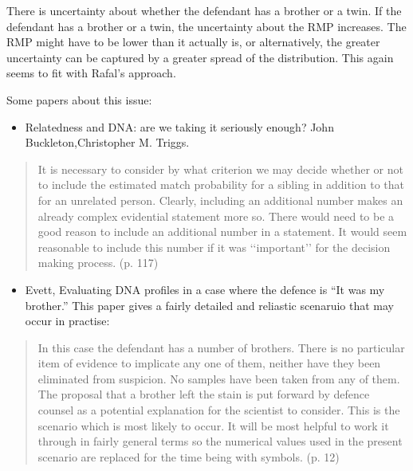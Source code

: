 \documentclass[
  10pt,
  dvipsnames,enabledeprecatedfontcommands]{scrartcl}
\providecommand{\tightlist}{%
  \setlength{\itemsep}{0pt}\setlength{\parskip}{0pt}}
\begin{document}
There is uncertainty about whether the defendant has a brother or a
twin. If the defendant has a brother or a twin, the uncertainty about
the RMP increases. The RMP might have to be lower than it actually is,
or alternatively, the greater uncertainty can be captured by a greater
spread of the distribution. This again seems to fit with Rafal's
approach.


Some papers about this issue:

\begin{itemize}
\tightlist
\item
  Relatedness and DNA: are we taking it seriously enough? John
  Buckleton,Christopher M. Triggs.
\end{itemize}

\begin{quote}
 It is necessary to consider by what criterion we may
decide whether or not to include the estimated match
probability for a sibling in addition to that for an unrelated
person. Clearly, including an additional number makes an
already complex evidential statement more so. There would
need to be a good reason to include an additional number
in a statement. It would seem reasonable to include
this number if it was ‘‘important’’ for the decision making
process. (p. 117)
\end{quote}

\begin{itemize}
\tightlist
\item
  Evett, Evaluating DNA profiles in a case where the defence is ``It was
  my brother.'' This paper gives a fairly detailed and reliastic
  scenaruio that may occur in practise:
\end{itemize}

\begin{quote}
In this case the defendant has a number of brothers. There is no particular
item of evidence to implicate any one of them, neither have they been
eliminated from suspicion. No samples have been taken from any of them.
The proposal that a brother left the stain is put forward by defence counsel
as a potential explanation for the scientist to consider.
This is the scenario which is most likely to occur. It will be most helpful to
work it through in fairly general terms so the numerical values used in the
present scenario are replaced for the time being with symbols. (p. 12)
\end{quote}
\end{document}
